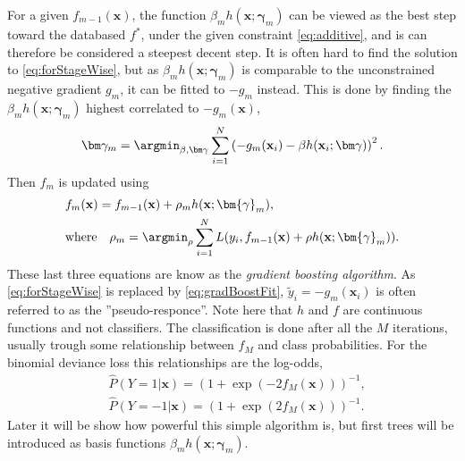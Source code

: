 For a given $f_{m-1}(\mathbf{x})$, the function $\beta_m h(\mathbf{x}; \bm{\gamma}_m)$ can be viewed as the best step toward the databased $f^*$, under the given constraint \eqref{eq:additive}, and is can therefore be considered a steepest decent step. It is often hard to find the solution to \eqref{eq:forStageWise}, but as $\beta_m h(\mathbf{x}; \bm{\gamma}_m)$ is comparable to the unconstrained negative gradient $g_m$, it can be fitted to $-g_m$ instead. This is done by finding the $\beta_m h(\mathbf{x}; \bm{\gamma}_m)$ highest correlated to $-g_m(\mathbf{x})$,
\begin{align}
  \label{eq:gradBoostFit} 
  \bm \gamma_m = \argmin_{\beta, \bm \gamma} \sum^{N}_{i=1} \left( -g_m(\mathbf{x}_i) - \beta h(\mathbf{x}_i; \bm \gamma) \right)^2.
\end{align}
Then $f_m$ is updated using
\begin{align}
  &f_m(\mathbf{x}) = f_{m-1}(\mathbf{x}) + \rho_m h(\mathbf{x}; \bm{\gamma}_{m}),\\
  \label{eq:lineSearch} 
  &\text{where} \quad \rho_m = \argmin_\rho \sum^{N}_{i=1} L(y_i, f_{m-1}(\mathbf{x}) + \rho h(\mathbf{x}; \bm{\gamma}_m)).
\end{align}
These last three equations are know as the \textit{gradient boosting algorithm}.
As \eqref{eq:forStageWise} is replaced by \eqref{eq:gradBoostFit}, $\tilde{y}_i = -g_m(\mathbf{x}_i)$ is often referred to as the ''pseudo-responce''. 
Note here that $h$ and $f$ are continuous functions and not classifiers. The classification is done after all the $M$ iterations, usually trough some relationship between $f_M$ and class probabilities. For the binomial deviance loss this relationships are the log-odds,
\begin{align}
  \label{eq:boostLogOdds1} 
  &\hat P(Y = 1 |  \mathbf{x}) = \left( 1+ \exp\left( -2 f_M (\mathbf{x}) \right) \right)^{-1},\\
  \label{eq:boostLogOdds2} 
  &\hat P(Y = -1 |  \mathbf{x}) = \left( 1+ \exp\left( 2 f_M (\mathbf{x}) \right) \right)^{-1}.
\end{align}
Later it will be show how powerful this simple algorithm is, but first trees will be introduced as basis functions $\beta_m h(\mathbf{x}; \bm{\gamma}_m)$.

